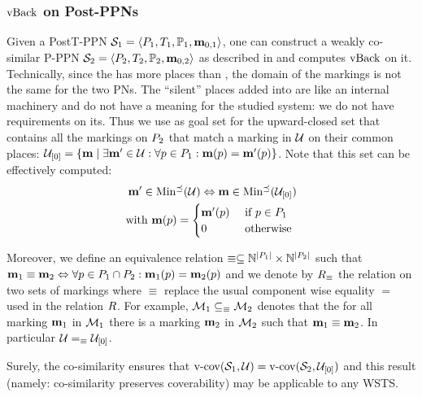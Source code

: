 \subsubsection{$\vback$ on Post-PPNs}

Given a PostT-PPN $\defPPN[1]$,
one can construct a weakly co-similar P-PPN $\defPPN[2]$ as described in  and computes $\vback$ on it.
Technically, since the \namePPN[2] has more places than \namePPN[1], the domain of the markings is not the same for the two PNs.
The ``silent'' places added into \namePPN[2] are like an internal machinery and do not have a meaning for the studied system: we do not have requirements on its.
Thus we use as goal set for \namePPN[2] the upward-closed set that contains all the markings on $\places_2$ that match a marking in $\ucs$ on their common places:
$
  \ucse = \setComp
            {\mar}
            {\exists \mar' \in \ucs
            : \forall p \in \places_1
            : \mar(p) = \mar'(p)}
$.
Note that this set can be effectively computed:
\begin{align*}
  \mar' \in \minp{\ucs}
  \Leftrightarrow
  \mar \in \minp{\ucse} \\
  \text{with }
  \mar(p) = \begin{cases}
    \mar'(p)  &\tif p \in \places_1 \\
    0         &\tothrw
  \end{cases}
\end{align*}

Moreover, we define an equivalence relation
$\equiv \subseteq \naturals^{\card{\places_1}} \times \naturals^{\card{\places_2}}$
such that
$
  \mar_1 \equiv \mar_2
  \Leftrightarrow
  \forall p \in \places_1 \cap \places_2 : \mar_1(p) = \mar_2(p)
$ and we denote by $\rela_\equiv$ the relation on two sets of markings where $\equiv$ replace the usual component wise equality $=$ used in the relation $\rela$.
For example, $\setm_1 \subseteq_\equiv \setm_2$ denotes that the for all marking $\mar_1$ in $\setm_1$ there is a marking  $\mar_2$ in $\setm_2$ such that $\mar_1 \equiv \mar_2$.
In particular $\ucs =_\equiv \ucse$.

Surely, the co-similarity ensures that
$\vcov{\namePPN[1]}{\ucs} = \vcov{\namePPN[2]}{\ucse}$
and this result (namely: co-similarity preserves coverability) may be applicable to any \ac{WSTS}.


